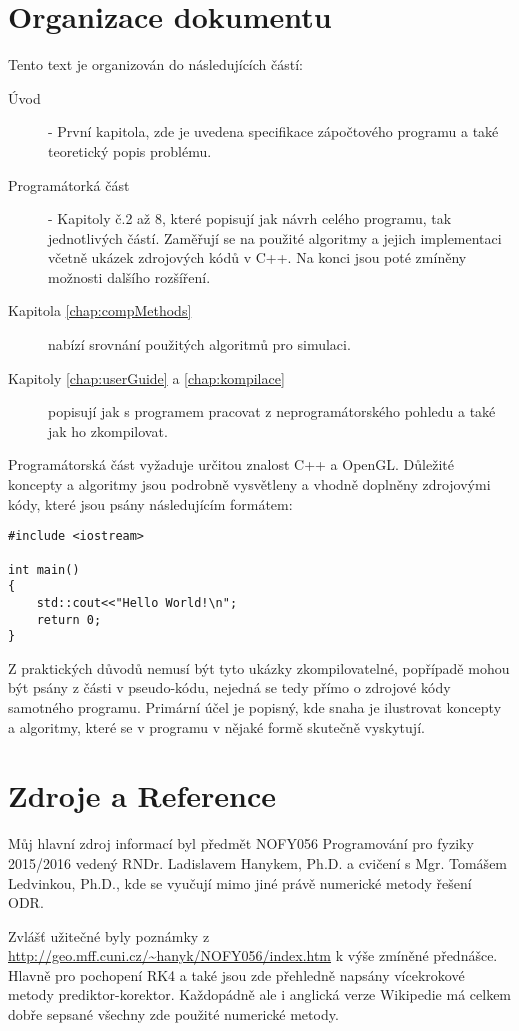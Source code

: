
\chapter*{Organizace dokumentu}
Tento text je organizován do následujících částí:
\begin{description}
	\item[Úvod] - První kapitola, zde je uvedena specifikace zápočtového programu a také teoretický popis problému.
	\item[Programátorká část] - Kapitoly č.2 až 8, které popisují jak návrh celého programu, tak jednotlivých částí. Zaměřují se na použité algoritmy a jejich implementaci včetně ukázek zdrojových kódů v C++. Na konci jsou poté zmíněny možnosti dalšího rozšíření.
	\item[Kapitola \ref{chap:compMethods} ] nabízí srovnání použitých algoritmů pro simulaci.
	\item[Kapitoly \ref{chap:userGuide} a \ref{chap:kompilace}] popisují jak s programem pracovat z neprogramátorského pohledu a také jak ho zkompilovat.
\end{description}
Programátorská část vyžaduje určitou znalost C++ a OpenGL. Důležité koncepty a algoritmy jsou podrobně vysvětleny a vhodně doplněny zdrojovými kódy, které jsou psány následujícím formátem:
\begin{lstlisting}[title=Název vystihující příklad]
#include <iostream>

int main()
{
	std::cout<<"Hello World!\n";
	return 0;
}
\end{lstlisting}
Z praktických důvodů nemusí být tyto ukázky zkompilovatelné, popřípadě mohou být psány z části v pseudo-kódu, nejedná se tedy přímo o zdrojové kódy samotného programu. Primární účel je popisný, kde snaha je ilustrovat koncepty a algoritmy, které se v programu v nějaké formě skutečně vyskytují.

\chapter*{Zdroje a Reference}
Můj hlavní zdroj informací byl předmět NOFY056 Programování pro fyziky 2015/2016 vedený RNDr. Ladislavem Hanykem, Ph.D. a cvičení s Mgr. Tomášem Ledvinkou, Ph.D., kde se vyučují mimo jiné právě numerické metody řešení ODR. 

Zvlášť užitečné byly poznámky z \url{http://geo.mff.cuni.cz/~hanyk/NOFY056/index.htm} k výše zmíněné přednášce. Hlavně pro pochopení RK4 a také jsou zde přehledně napsány vícekrokové metody prediktor-korektor. Každopádně ale i anglická verze Wikipedie má celkem dobře sepsané všechny zde použité numerické metody.
